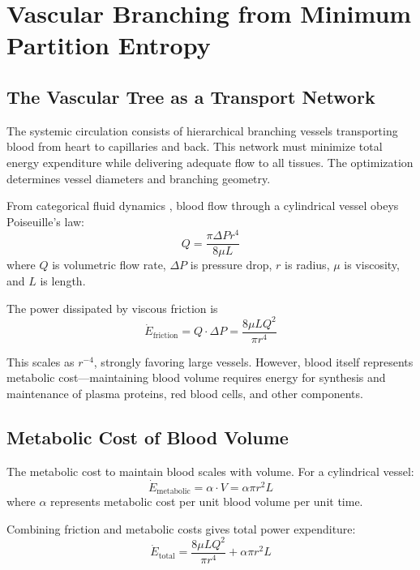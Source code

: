 \section{Vascular Branching from Minimum Partition Entropy}
\label{sec:vascular}

\subsection{The Vascular Tree as a Transport Network}

The systemic circulation consists of hierarchical branching vessels transporting blood from heart to capillaries and back. This network must minimize total energy expenditure while delivering adequate flow to all tissues. The optimization determines vessel diameters and branching geometry.

From categorical fluid dynamics \cite{sachikonye2024fluid}, blood flow through a cylindrical vessel obeys Poiseuille's law:
\begin{equation}
Q = \frac{\pi \Delta P r^{4}}{8 \mu L}
\end{equation}
where $Q$ is volumetric flow rate, $\Delta P$ is pressure drop, $r$ is radius, $\mu$ is viscosity, and $L$ is length.

The power dissipated by viscous friction is
\begin{equation}
\dot{E}_{\mathrm{friction}} = Q \cdot \Delta P = \frac{8\mu L Q^{2}}{\pi r^{4}}
\end{equation}

This scales as $r^{-4}$, strongly favoring large vessels. However, blood itself represents metabolic cost—maintaining blood volume requires energy for synthesis and maintenance of plasma proteins, red blood cells, and other components.

\subsection{Metabolic Cost of Blood Volume}

The metabolic cost to maintain blood scales with volume. For a cylindrical vessel:
\begin{equation}
\dot{E}_{\mathrm{metabolic}} = \alpha \cdot V = \alpha \pi r^{2} L
\end{equation}
where $\alpha$ represents metabolic cost per unit blood volume per unit time.

Combining friction and metabolic costs gives total power expenditure:
\begin{equation}
\dot{E}_{\mathrm{total}} = \frac{8\mu L Q^{2}}{\pi r^{4}} + \alpha \pi r^{2} L
\end{equation}

